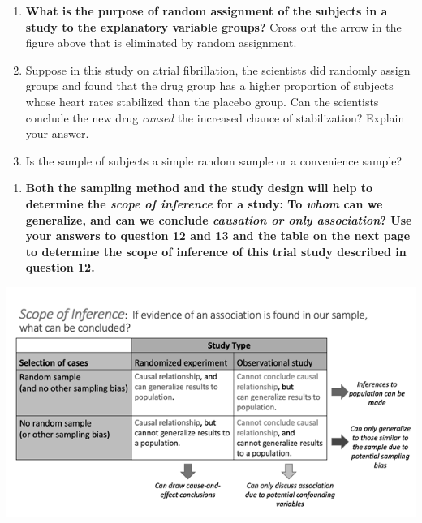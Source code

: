 \documentclass[
]{report}
\providecommand{\tightlist}{%
  \setlength{\itemsep}{0pt}\setlength{\parskip}{0pt}}
\begin{document}
\begin{enumerate}
\def\labelenumi{\arabic{enumi}.}
\setcounter{enumi}{10}
\item
  \textbf{What is the purpose of random assignment of the subjects in a study to the explanatory variable groups?} Cross out the arrow in the figure above that is eliminated by random assignment.
  \vspace{0.8in}
\item
  Suppose in this study on atrial fibrillation, the scientists did randomly assign groups and found that the drug group has a higher proportion of subjects whose heart rates stabilized than the placebo group. Can the scientists conclude the new drug \emph{caused} the increased chance of stabilization? Explain your answer.
  \vspace{0.8in}
\item
  Is the sample of subjects a simple random sample or a convenience sample?
\end{enumerate}

\vspace{0.3in}

\begin{enumerate}
\def\labelenumi{\arabic{enumi}.}
\setcounter{enumi}{13}
\tightlist
\item
  \textbf{Both the sampling method and the study design will help to determine the \emph{scope of inference} for a study: To \emph{whom} can we generalize, and can we conclude \emph{causation or only association}? Use your answers to question 12 and 13 and the table on the next page to determine the scope of inference of this trial study described in question 12.}
  \vspace{0.3in}
\end{enumerate}

\begin{center}\includegraphics[width=0.75\linewidth]{images/ScopeOfInferenceGreyscale} \end{center}
\end{document}
